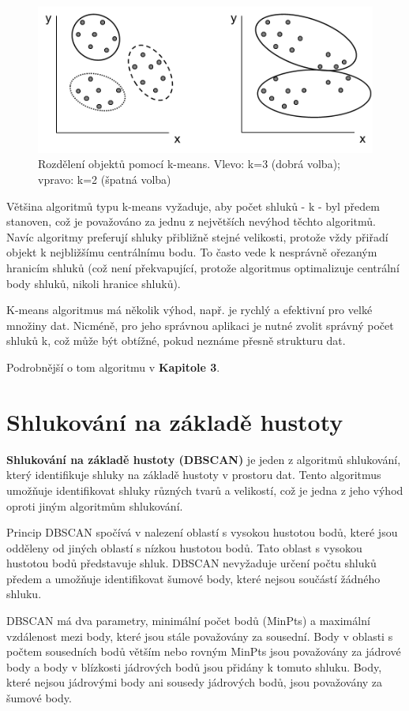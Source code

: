 \documentclass[czech,bachelor]{seminarka}
\begin{document}
\begin{figure}[h]
	\centering
	\includegraphics[width=0.515\linewidth]{Figures/kmeans.png}
	\caption{Rozdělení objektů pomocí k-means. Vlevo: k=3 (dobrá volba); vpravo: k=2 (špatná volba)\cite{mat_bio}}
\end{figure}

Většina algoritmů typu k-means vyžaduje, aby počet shluků - k - byl předem stanoven, což je považováno za jednu z největších nevýhod těchto algoritmů. Navíc algoritmy preferují shluky přibližně stejné velikosti, protože vždy přiřadí objekt k nejbližšímu centrálnímu bodu. To často vede k nesprávně ořezaným hranicím shluků (což není překvapující, protože algoritmus optimalizuje centrální body shluků, nikoli hranice shluků).

K-means algoritmus má několik výhod, např. je rychlý a efektivní pro velké množiny dat. Nicméně, pro jeho správnou aplikaci je nutné zvolit správný počet shluků k, což může být obtížné, pokud neznáme přesně strukturu dat.

Podrobnější o tom algoritmu v \textbf{Kapitole 3}.
\section{Shlukování na základě hustoty}

\textbf{Shlukování na základě hustoty (DBSCAN) }je jeden z algoritmů shlukování, který identifikuje shluky na základě hustoty v prostoru dat. Tento algoritmus umožňuje identifikovat shluky různých tvarů a velikostí, což je jedna z jeho výhod oproti jiným algoritmům shlukování.

Princip DBSCAN spočívá v nalezení oblastí s vysokou hustotou bodů, které jsou odděleny od jiných oblastí s nízkou hustotou bodů. Tato oblast s vysokou hustotou bodů představuje shluk. DBSCAN nevyžaduje určení počtu shluků předem a umožňuje identifikovat šumové body, které nejsou součástí žádného shluku.

DBSCAN má dva parametry, minimální počet bodů (MinPts) a maximální vzdálenost mezi body, které jsou stále považovány za sousední. Body v oblasti s počtem sousedních bodů větším nebo rovným MinPts jsou považovány za jádrové body a body v blízkosti jádrových bodů jsou přidány k tomuto shluku. Body, které nejsou jádrovými body ani sousedy jádrových bodů, jsou považovány za šumové body.
\end{document}

